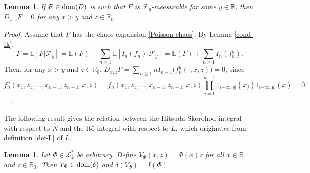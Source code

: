 \documentclass[12pt]{article}
\newtheorem{lemma}[theorem]{Lemma}
\def\cF{\mathcal{F}}
\def\cL{\mathcal{L}}
\def\bE{\mathbb{E}}
\def\bR{\mathbb{R}}
\begin{document}
\begin{lemma}
\label{Fa-meas}
If $F \in {\rm dom}(D)$ is such that $F$ is $\cF_y$-measurable for some $y \in \bR$, then $D_{x,z}F=0$ for any $x>y$ and $z \in \bR_0$.
\end{lemma}

\begin{proof}
Assume that $F$ has the chaos expansion \eqref{Poisson-chaos}. By Lemma \ref{cond-Ik},
\[
F=\bE[F|\cF_y] =\bE(F)+ \sum_{n\geq 1} \bE[I_n(f_n)|\cF_y]=\bE(F)+\sum_{n\geq 1}I_n(f_n^y).
\]
Then, for any $x>y$ and $z \in \bR_0$, $D_{x,z}F=\sum_{n\geq 1}n I_{n-1}\big(f_n^y(\cdot,x,z)\big)=0$, since
\[
f_n^y(x_1,z_1,\ldots,x_{n-1},z_{n-1},x,z)=f_n(x_1,z_1,\ldots,x_{n-1},z_{n-1},x,z)\prod_{j=1}^{n-1}1_{(-\infty,y]}(x_j)
1_{(-\infty,y]}(x)=0.
\] 
\end{proof}


The following result gives the relation between the Hitsuda-Skorohod integral with respect to $\widehat{N}$ and the It\^o integral with respect to $L$, which originates from definition \eqref{def-L} of $L$.

\begin{lemma}
\label{Ito-Skor}
Let $\Phi \in \cL_2^*$ be arbitrary. Define $V_{\Phi}(x,z)=\Phi(x)z$ for all $x \in \bR$ and $z \in \bR_0$. Then $V_{\Phi} \in {\rm dom}(\delta)$ and $\delta(V_{\Phi})=I(\Phi)$.
\end{lemma}
\end{document}
